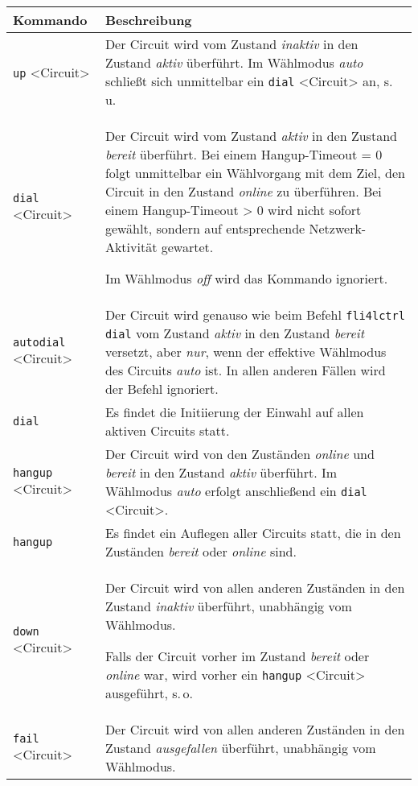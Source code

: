 \begin{longtable}{|p{}|p{}|}
    \hline
    \multicolumn{1}{|l}{\textbf{Kommando}} &
    \multicolumn{1}{|l|}{\textbf{Beschreibung}} \\
    \hline
    \endhead
    \hline
    \endfoot
    \endlastfoot

\texttt{up} <Circuit> &
Der Circuit wird vom Zustand \emph{inaktiv} in den Zustand \emph{aktiv}
überführt. Im Wählmodus \emph{auto} schließt sich unmittelbar ein \texttt{dial}
<Circuit> an, s.\,u.
    \\
    \hline
\texttt{dial} <Circuit> &
Der Circuit wird vom Zustand \emph{aktiv} in den Zustand \emph{bereit}
überführt. Bei einem Hangup-Timeout = 0 folgt unmittelbar ein Wählvorgang mit
dem Ziel, den Circuit in den Zustand \emph{online} zu überführen. Bei einem
Hangup-Timeout > 0 wird nicht sofort gewählt, sondern auf entsprechende
Netzwerk-Aktivität gewartet.

Im Wählmodus \emph{off} wird das Kommando ignoriert.
    \\
    \hline
\texttt{autodial} <Circuit> &
Der Circuit wird genauso wie beim Befehl \texttt{fli4lctrl dial} vom Zustand
\emph{aktiv} in den Zustand \emph{bereit} versetzt, aber \emph{nur}, wenn der
effektive Wählmodus des Circuits \emph{auto} ist. In allen anderen Fällen wird
der Befehl ignoriert.
    \\
    \hline
\texttt{dial} &
Es findet die Initiierung der Einwahl auf allen aktiven Circuits statt.
    \\
    \hline
\texttt{hangup} <Circuit> &
Der Circuit wird von den Zuständen \emph{online} und \emph{bereit} in den
Zustand \emph{aktiv} überführt. Im Wählmodus \emph{auto} erfolgt anschließend
ein \texttt{dial} <Circuit>.
    \\
    \hline
\texttt{hangup} &
Es findet ein Auflegen aller Circuits statt, die in den Zuständen \emph{bereit}
oder \emph{online} sind.
    \\
    \hline
\texttt{down} <Circuit> &
Der Circuit wird von allen anderen Zuständen in den Zustand \emph{inaktiv}
überführt, unabhängig vom Wähl\-modus.

Falls der Circuit vorher im Zustand \emph{bereit} oder \emph{online} war, wird
vorher ein \texttt{hangup} <Circuit> ausgeführt, s.\,o.
    \\
    \hline
\texttt{fail} <Circuit> &
Der Circuit wird von allen anderen Zuständen in den Zustand \emph{ausgefallen}
überführt, unabhängig vom Wählmodus.


\end{longtable}
